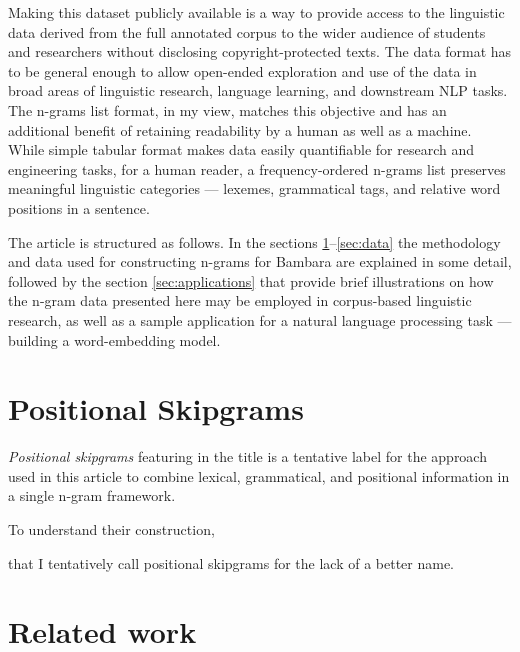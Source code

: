 \documentclass[12pt]{article}
\begin{document}
Making this dataset publicly available is a way to provide access to
the linguistic data derived from the full annotated corpus to the
wider audience of students and researchers without disclosing
copyright-protected texts. The data format has to be general enough to
allow open-ended exploration and use of the data in broad areas of
linguistic research, language learning, and downstream NLP tasks.  The
n-grams list format, in my view, matches this objective and has an
additional benefit of retaining readability by a human as well as a
machine. While simple tabular format makes data easily quantifiable
for research and engineering tasks, for a human reader, a
frequency-ordered n-grams list preserves meaningful linguistic
categories — lexemes, grammatical tags, and relative word positions in
a sentence. %


The article is structured as follows. In the sections
\ref{sec:definition}--\ref{sec:data} the methodology and data used for
constructing n-grams for Bambara are explained in some detail,
followed by the section \ref{sec:applications} that provide brief
illustrations on how the n-gram data presented here may be employed in
corpus-based linguistic research, as well as a sample application for
a natural language processing task — building a word-embedding model.

\section{Positional Skipgrams}
\label{sec:definition}

\textit{Positional skipgrams} featuring in the title is a tentative
label for the approach used in this article to combine lexical,
grammatical, and positional information in a single n-gram framework.

To understand their construction, 



% 

that I tentatively call positional skipgrams for the lack of a better
name.


\section{Related work}
\end{document}
